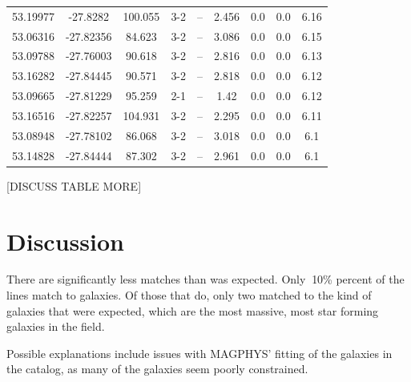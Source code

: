 \begin{table}
\begin{tabular}{ccccccccc}
53.19977 & -27.8282 & 100.055 & 3-2 & -- & 2.456 & 0.0 & 0.0 & 6.16 \\
53.06316 & -27.82356 & 84.623 & 3-2 & -- & 3.086 & 0.0 & 0.0 & 6.15 \\
53.09788 & -27.76003 & 90.618 & 3-2 & -- & 2.816 & 0.0 & 0.0 & 6.13 \\
53.16282 & -27.84445 & 90.571 & 3-2 & -- & 2.818 & 0.0 & 0.0 & 6.12 \\
53.09665 & -27.81229 & 95.259 & 2-1 & -- & 1.42 & 0.0 & 0.0 & 6.12 \\
53.16516 & -27.82257 & 104.931 & 3-2 & -- & 2.295 & 0.0 & 0.0 & 6.11 \\
53.08948 & -27.78102 & 86.068 & 3-2 & -- & 3.018 & 0.0 & 0.0 & 6.1 \\
53.14828 & -27.84444 & 87.302 & 3-2 & -- & 2.961 & 0.0 & 0.0 & 6.1 \\
\end{tabular}
\end{table}\label{table:Catalog}

[DISCUSS TABLE MORE]

\section{Discussion}

There are significantly less matches than was expected. Only $~$10\% percent of the lines match to galaxies. Of those that do, only two matched to the kind of galaxies that were expected, which are the most massive, most star forming galaxies in the field. 

Possible explanations include issues with MAGPHYS' fitting of the galaxies in the catalog, as many of the galaxies seem poorly constrained. 